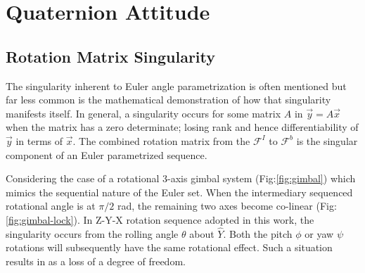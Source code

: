 \section{Quaternion Attitude}
\subsection{Rotation Matrix Singularity}\label{subsec:dynamics.rigidbody.singularity}
The singularity inherent to Euler angle parametrization is often mentioned but far less common is the mathematical demonstration of how that singularity manifests itself.  In general, a singularity occurs for some matrix $A$ in $\vec{y}=A\vec{x}$ when the matrix has a zero determinate; losing rank and hence differentiability of $\vec{y}$ in terms of $\vec{x}$. The combined rotation matrix from the $\mathcal{F}^{I}$ to $\mathcal{F}^{b}$ is the singular component of an Euler parametrized sequence. 
\par
Considering the case of a rotational 3-axis gimbal system (Fig:\ref{fig:gimbal}) which mimics the sequential nature of the Euler set. When the intermediary sequenced rotational angle is at $\pi/2$ rad, the remaining two axes become co-linear (Fig:\ref{fig:gimbal-lock}). In Z-Y-X rotation sequence adopted in this work, the singularity occurs from the rolling angle $\theta$ about $\hat{Y}$. Both the pitch $\phi$ or yaw $\psi$ rotations will subsequently have the same rotational effect. Such a situation results in as a loss of a degree of freedom.
\newpage
